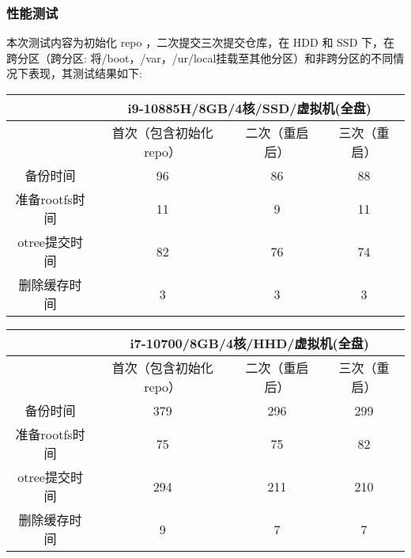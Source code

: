 \documentclass{utart}
\begin{document}
\subsubsection{性能测试}
本次测试内容为初始化 repo ，二次提交三次提交仓库，在 HDD 和 SSD 下，在跨分区（跨分区: 将/boot，/var，/ur/local挂载至其他分区）和非跨分区的不同情况下表现，其测试结果如下:
\begin{table}[H]
  \begin{tabular}{|c|ccc|}
  \hline
             & \multicolumn{3}{c|}{i9-10885H/8GB/4核/SSD/虚拟机(全盘)}                          \\ \hline
             & \multicolumn{1}{c|}{首次（包含初始化repo）} & \multicolumn{1}{c|}{二次（重启后）} & 三次（重启） \\ \hline
  备份时间       & \multicolumn{1}{c|}{96}            & \multicolumn{1}{c|}{86}      & 88     \\ \hline
  准备rootfs时间 & \multicolumn{1}{c|}{11}            & \multicolumn{1}{c|}{9}       & 11     \\ \hline
  otree提交时间  & \multicolumn{1}{c|}{82}            & \multicolumn{1}{c|}{76}      & 74     \\ \hline
  删除缓存时间     & \multicolumn{1}{c|}{3}             & \multicolumn{1}{c|}{3}       & 3      \\ \hline
  \end{tabular}
  \end{table}
\begin{table}[H]
  \begin{tabular}{|c|ccc|}
  \hline
              & \multicolumn{3}{c|}{i7-10700/8GB/4核/HHD/虚拟机(全盘)}                           \\ \hline
              & \multicolumn{1}{c|}{首次（包含初始化repo）} & \multicolumn{1}{c|}{二次（重启后）} & 三次（重启） \\ \hline
  备份时间       & \multicolumn{1}{c|}{379}           & \multicolumn{1}{c|}{296}     & 299    \\ \hline
  准备rootfs时间 & \multicolumn{1}{c|}{75}            & \multicolumn{1}{c|}{75}      & 82     \\ \hline
  otree提交时间  & \multicolumn{1}{c|}{294}           & \multicolumn{1}{c|}{211}     & 210    \\ \hline
  删除缓存时间     & \multicolumn{1}{c|}{9}             & \multicolumn{1}{c|}{7}       & 7      \\ \hline
  \end{tabular}
  \end{table}
\end{document}
